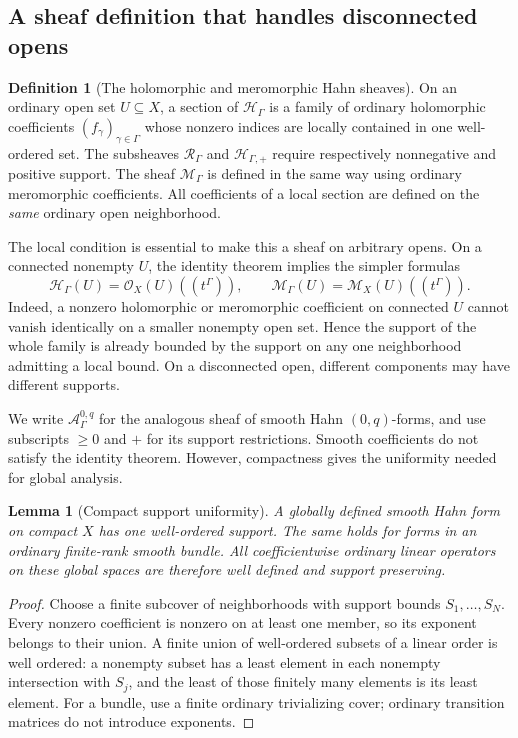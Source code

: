 \documentclass[11pt,letterpaper]{article}
\numberwithin{equation}{section}
\newtheorem{lemma}[theorem]{Lemma}
\theoremstyle{definition}
\newtheorem{definition}[theorem]{Definition}
\theoremstyle{remark}
\newcommand{\HH}{\mathcal H}
\newcommand{\RR}{\mathcal R}
\newcommand{\MM}{\mathscr M}
\newcommand{\OO}{\mathcal O}
\newcommand{\Acal}{\mathcal A}
\newcommand{\Hp}{\HH_{\Gamma,+}}
\newcommand{\Hg}{\HH_\Gamma}
\newcommand{\Rg}{\RR_\Gamma}
\newcommand{\Mg}{\MM_\Gamma}
\begin{document}
\subsection{A sheaf definition that handles disconnected opens}
\begin{definition}[The holomorphic and meromorphic Hahn sheaves]
On an ordinary open set $U\subseteq X$, a section of $\Hg$ is a family
of ordinary holomorphic coefficients $(f_\gamma)_{\gamma\in\Gamma}$
whose nonzero indices are locally contained in one well-ordered set.
The subsheaves $\Rg$ and $\Hp$ require respectively nonnegative and
positive support. The sheaf $\Mg$ is defined in the same way using
ordinary meromorphic coefficients. All coefficients of a local section
are defined on the \emph{same} ordinary open neighborhood.
\end{definition}

The local condition is essential to make this a sheaf on arbitrary
opens. On a connected nonempty $U$, the identity theorem implies the
simpler formulas
\begin{equation}
 \Hg(U)=\OO_X(U)((t^\Gamma)),\qquad
 \Mg(U)=\MM_X(U)((t^\Gamma)).
 \label{eq:connectedsections}
\end{equation}
Indeed, a nonzero holomorphic or meromorphic coefficient on connected
$U$ cannot vanish identically on a smaller nonempty open set. Hence the
support of the whole family is already bounded by the support on any
one neighborhood admitting a local bound. On a disconnected open,
different components may have different supports.

We write $\Acal^{0,q}_\Gamma$ for the analogous sheaf of smooth Hahn
$(0,q)$-forms, and use subscripts $\ge0$ and $+$ for its support
restrictions. Smooth coefficients do not satisfy the identity theorem.
However, compactness gives the uniformity needed for global analysis.

\begin{lemma}[Compact support uniformity]
\label{lem:compact}
A globally defined smooth Hahn form on compact $X$ has one well-ordered
support. The same holds for forms in an ordinary finite-rank smooth
bundle. All coefficientwise ordinary linear operators on these global
spaces are therefore well defined and support preserving.
\end{lemma}
\begin{proof}
Choose a finite subcover of neighborhoods with support bounds
$S_1,\ldots,S_N$. Every nonzero coefficient is nonzero on at least one
member, so its exponent belongs to their union. A finite union of
well-ordered subsets of a linear order is well ordered: a nonempty
subset has a least element in each nonempty intersection with $S_j$,
and the least of those finitely many elements is its least element.
For a bundle, use a finite ordinary trivializing cover; ordinary
transition matrices do not introduce exponents.
\end{proof}
\end{document}

